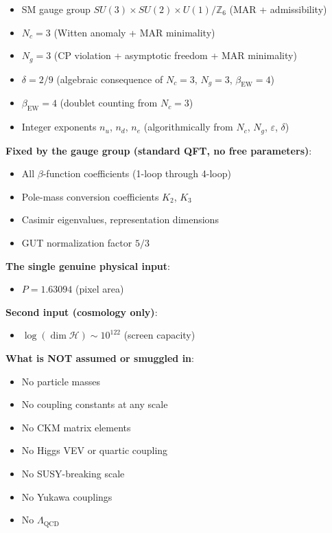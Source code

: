 \begin{itemize}
\tightlist
\item
  SM gauge group \(SU(3) \times SU(2) \times U(1)/\mathbb{Z}_6\) (MAR + admissibility)
\item
  \(N_c = 3\) (Witten anomaly + MAR minimality)
\item
  \(N_g = 3\) (CP violation + asymptotic freedom + MAR minimality)
\item
  \(\delta = 2/9\) (algebraic consequence of \(N_c = 3\), \(N_g = 3\), \(\beta_{\text{EW}} = 4\))
\item
  \(\beta_{\text{EW}} = 4\) (doublet counting from \(N_c = 3\))
\item
  Integer exponents \(n_u\), \(n_d\), \(n_e\) (algorithmically from \(N_c\), \(N_g\), \(\varepsilon\), \(\delta\))
\end{itemize}

\textbf{Fixed by the gauge group (standard QFT, no free parameters)}:

\begin{itemize}
\tightlist
\item
  All \(\beta\)-function coefficients (1-loop through 4-loop)
\item
  Pole-mass conversion coefficients \(K_2\), \(K_3\)
\item
  Casimir eigenvalues, representation dimensions
\item
  GUT normalization factor \(5/3\)
\end{itemize}

\textbf{The single genuine physical input}:

\begin{itemize}
\tightlist
\item
  \(P = 1.63094\) (pixel area)
\end{itemize}

\textbf{Second input (cosmology only)}:

\begin{itemize}
\tightlist
\item
  \(\log(\dim\mathcal{H}) \sim 10^{122}\) (screen capacity)
\end{itemize}

\textbf{What is NOT assumed or smuggled in}:

\begin{itemize}
\tightlist
\item
  No particle masses
\item
  No coupling constants at any scale
\item
  No CKM matrix elements
\item
  No Higgs VEV or quartic coupling
\item
  No SUSY-breaking scale
\item
  No Yukawa couplings
\item
  No \(\Lambda_{\text{QCD}}\)
\end{itemize}

